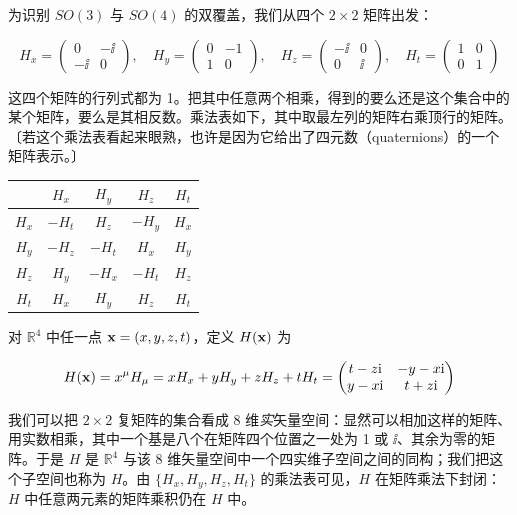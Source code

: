 为识别 $SO(3)$ 与 $SO(4)$ 的双覆盖，我们从四个 $2\times2$ 矩阵出发：

\[
H_{x}=\begin{pmatrix}0 & -\ii\\ -\ii & 0\end{pmatrix},\quad
H_{y}=\begin{pmatrix}0 & -1\\ 1 & 0\end{pmatrix},\quad
H_{z}=\begin{pmatrix}-\ii & 0\\ 0 & \ii\end{pmatrix},\quad
H_{t}=\begin{pmatrix}1 & 0\\ 0 & 1\end{pmatrix}
\]

这四个矩阵的行列式都为 1。把其中任意两个相乘，得到的要么还是这个集合中的某个矩阵，要么是其相反数。乘法表如下，其中取最左列的矩阵右乘顶行的矩阵。〔若这个乘法表看起来眼熟，也许是因为它给出了四元数（quaternions）的一个矩阵表示。〕

\begin{center}
\begin{tabular}{c|cccc}
 & $H_{x}$ & $H_{y}$ & $H_{z}$ & $H_{t}$\\\hline
$H_{x}$ & $-H_{t}$ & $H_{z}$ & $-H_{y}$ & $H_{x}$\\
$H_{y}$ & $-H_{z}$ & $-H_{t}$ & $H_{x}$ & $H_{y}$\\
$H_{z}$ & $H_{y}$ & $-H_{x}$ & $-H_{t}$ & $H_{z}$\\
$H_{t}$ & $H_{x}$ & $H_{y}$ & $H_{z}$ & $H_{t}$
\end{tabular}
\end{center}

对 $\mathbb{R}^{4}$ 中任一点 $\mathbf{x}=(x,y,z,t)$，定义 $H(\mathbf{x})$ 为

\[
H(\mathbf{x})=x^{\mu}H_{\mu}=xH_{x}+yH_{y}+zH_{z}+tH_{t}
=\begin{pmatrix} t-z\mathrm{i} & -y-x\mathrm{i}\\ y-x\mathrm{i} & t+z\mathrm{i}\end{pmatrix}
\]

我们可以把 $2\times2$ 复矩阵的集合看成 8 维\emph{实}矢量空间：显然可以相加这样的矩阵、用实数相乘，其中一个基是八个在矩阵四个位置之一处为 1 或 $\ii$、其余为零的矩阵。于是 $H$ 是 $\mathbb{R}^{4}$ 与该 8 维矢量空间中一个四实维子空间之间的同构；我们把这个子空间也称为 $H$。由 $\{H_{x},H_{y},H_{z},H_{t}\}$ 的乘法表可见，$H$ 在矩阵乘法下封闭：$H$ 中任意两元素的矩阵乘积仍在 $H$ 中。

